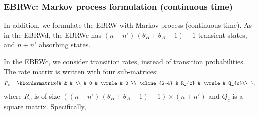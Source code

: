 \documentclass[doc]{apa6}
\begin{document}
\subsubsection{EBRWc: Markov process formulation (continuous time)}

In addition, we formulate the EBRW with Markov process (continuous time). As in the EBRWd, the EBRWc has $(n + n') \, (\theta_{B} + \theta_{A} - 1) + 1$ transient states, and $n + n'$ absorbing states.

In the EBRWc, we consider transition rates, instead of transition probabilities.  The rate matrix is written with four sub-matrices:
\begin{align}
    P_{c} = \kbordermatrix{%
        &       &        & \\
        & 0     & \vrule & 0 \\
        \cline{2-4}
        & R_{c} & \vrule & Q_{c}\\
      },
\end{align}
where $R_{c}$ is of size $\left((n + n') \, (\theta_{B} + \theta_{A} - 1) + 1 \right) \times (n +
n')$ and $Q_{c}$ is a square matrix. Specifically,
\end{document}
